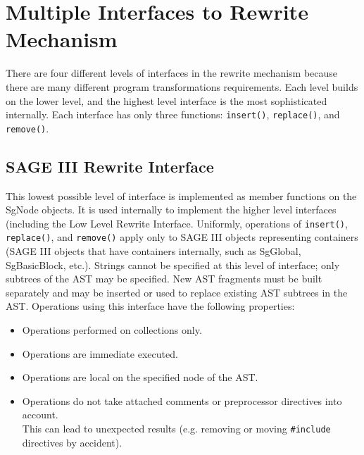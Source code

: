 \section{Multiple Interfaces to Rewrite Mechanism}

   There are four different levels of interfaces in the rewrite mechanism
because there are many different program transformations requirements.  Each level
builds on the lower level, and the highest level interface is the most sophisticated 
internally. Each interface has only three functions: {\tt insert()}, {\tt replace()}, 
and {\tt remove()}.

\subsection{SAGE III Rewrite Interface}
   This lowest possible level of interface is implemented as member functions on the
SgNode objects. It is used internally to implement the higher level interfaces (including
the Low Level Rewrite Interface.  Uniformly,
operations of {\tt insert()}, {\tt replace()}, and {\tt remove()} apply only to SAGE III 
objects representing containers (SAGE III objects that have containers internally, 
such as SgGlobal, SgBasicBlock, etc.).  Strings cannot be specified at this level of
interface; only subtrees of the AST may be specified.  New AST fragments must be
built separately and may be inserted or used to replace existing AST subtrees in the AST.
Operations using this interface have the following properties:
\begin{itemize}
   \item Operations performed on collections only.
   \item Operations are immediate executed.
   \item Operations are local on the specified node of the AST.
   \item Operations do not take attached comments or preprocessor directives into account. \\
    This can lead to unexpected results (e.g. removing or moving {\tt \#include} directives
    by accident).
\end{itemize}

